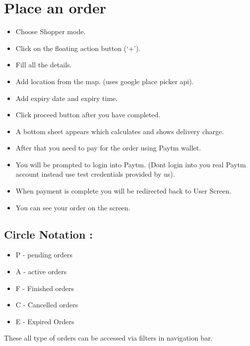 \documentclass{report}
\begin{document}
\section{Place an order}
\begin{itemize}[label=$\rightarrow$]
\item Choose Shopper mode.
\item Click on the floating action button (`+').
\item Fill all the details.
\item Add location from the map. (uses google place picker api).
\item Add expiry date and expiry time\footnotemark.
\item Click proceed button after you have completed.
\item A bottom sheet appears which calculates and shows delivery charge.
\item After that you need to pay for the order using Paytm wallet\footnotemark.
\item You will be prompted to login into Paytm. (Don\textquotesingle t login into you real Paytm account instead use test credentials provided by us).
\item When payment is complete you will be redirected back to User Screen.
\item You can see your order on the screen.
\end{itemize}


\subsection{Circle Notation :}
\begin{itemize}[label=$\circ$]
\item P - pending orders
\item A - active orders
\item F - Finished orders
\item C - Cancelled orders
\item E - Expired Orders 
\end{itemize}
These all type of orders can be accessed via filters in navigation bar.
\end{document}
